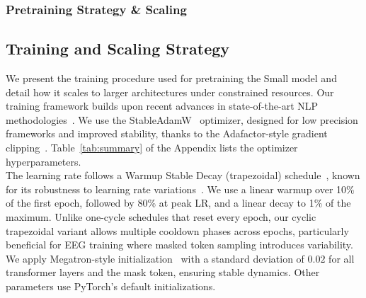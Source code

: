 \documentclass{article}
\begin{document}
\subsubsection{Pretraining Strategy \& Scaling}

\subsection{Training and Scaling Strategy}

We present the training procedure used for pretraining the Small model and detail how it scales to larger architectures under constrained resources.
Our training framework builds upon recent advances in state-of-the-art NLP methodologies~\citep{warner2024modernbert}. We use the StableAdamW~\citep{wortsman2023stable} optimizer, designed for low precision frameworks and improved stability, thanks to the Adafactor-style gradient clipping~\citep{shazeer2018adafactor}. Table~\ref{tab:summary} of the Appendix lists the optimizer hyperparameters.
\\
The learning rate follows a Warmup Stable Decay (trapezoidal) schedule~\citep{hu2024minicpm}, known for its robustness to learning rate variations~\citep{hagele2024scaling}. We use a linear warmup over 10\% of the first epoch, followed by 80\% at peak LR, and a linear decay to 1\% of the maximum. Unlike one-cycle schedules that reset every epoch, our cyclic trapezoidal variant allows multiple cooldown phases across epochs, particularly beneficial for EEG training where masked token sampling introduces variability.
We apply Megatron-style initialization~\citep{megatron2019} with a standard deviation of $0.02$ for all transformer layers and the mask token, ensuring stable dynamics. Other parameters use PyTorch's default initializations.
\end{document}
